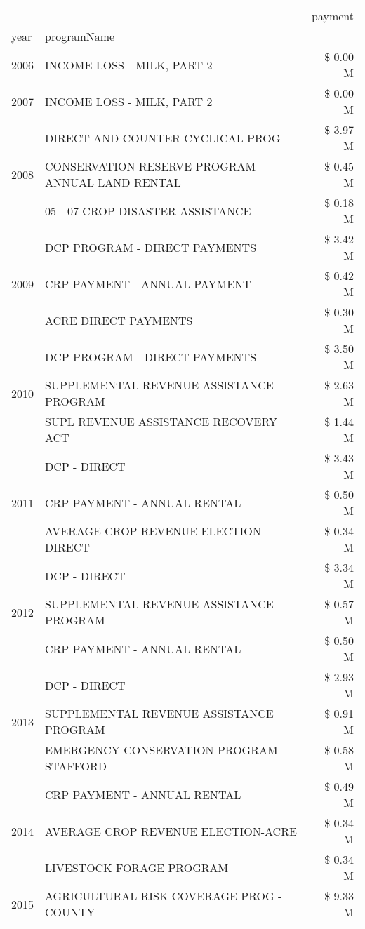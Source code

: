 \begin{tabular}{llr}
\toprule
 &  & payment \\
year & programName &  \\
\midrule
2006 & INCOME LOSS - MILK, PART 2 & \$ 0.00 M \\
\cline{1-3}
2007 & INCOME LOSS - MILK, PART 2 & \$ 0.00 M \\
\cline{1-3}
\multirow[t]{3}{*}{2008} & DIRECT AND COUNTER CYCLICAL PROG & \$ 3.97 M \\
 & CONSERVATION RESERVE PROGRAM - ANNUAL LAND RENTAL & \$ 0.45 M \\
 & 05 - 07 CROP DISASTER ASSISTANCE & \$ 0.18 M \\
\cline{1-3}
\multirow[t]{3}{*}{2009} & DCP PROGRAM - DIRECT PAYMENTS & \$ 3.42 M \\
 & CRP PAYMENT - ANNUAL PAYMENT & \$ 0.42 M \\
 & ACRE DIRECT PAYMENTS & \$ 0.30 M \\
\cline{1-3}
\multirow[t]{3}{*}{2010} & DCP PROGRAM - DIRECT PAYMENTS & \$ 3.50 M \\
 & SUPPLEMENTAL REVENUE ASSISTANCE PROGRAM & \$ 2.63 M \\
 & SUPL REVENUE ASSISTANCE RECOVERY ACT & \$ 1.44 M \\
\cline{1-3}
\multirow[t]{3}{*}{2011} & DCP - DIRECT & \$ 3.43 M \\
 & CRP PAYMENT - ANNUAL RENTAL & \$ 0.50 M \\
 & AVERAGE CROP REVENUE ELECTION-DIRECT & \$ 0.34 M \\
\cline{1-3}
\multirow[t]{3}{*}{2012} & DCP - DIRECT & \$ 3.34 M \\
 & SUPPLEMENTAL REVENUE ASSISTANCE PROGRAM & \$ 0.57 M \\
 & CRP PAYMENT - ANNUAL RENTAL & \$ 0.50 M \\
\cline{1-3}
\multirow[t]{3}{*}{2013} & DCP - DIRECT & \$ 2.93 M \\
 & SUPPLEMENTAL REVENUE ASSISTANCE PROGRAM & \$ 0.91 M \\
 & EMERGENCY CONSERVATION PROGRAM STAFFORD & \$ 0.58 M \\
\cline{1-3}
\multirow[t]{3}{*}{2014} & CRP PAYMENT - ANNUAL RENTAL & \$ 0.49 M \\
 & AVERAGE CROP REVENUE ELECTION-ACRE & \$ 0.34 M \\
 & LIVESTOCK FORAGE PROGRAM & \$ 0.34 M \\
\cline{1-3}
\multirow[t]{3}{*}{2015} & AGRICULTURAL RISK COVERAGE PROG - COUNTY & \$ 9.33 M \\

\end{tabular}

